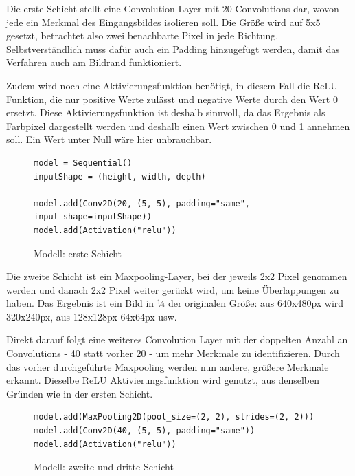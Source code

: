 \documentclass[conference]{IEEEtran}
\begin{document}
	Die erste Schicht stellt eine Convolution-Layer mit 20 Convolutions dar, 
	wovon jede ein Merkmal des Eingangsbildes isolieren soll.
	Die Größe wird auf 5x5 gesetzt, betrachtet also zwei benachbarte Pixel in 
	jede Richtung.
	Selbstverständlich muss dafür auch ein Padding hinzugefügt werden, damit das Verfahren auch am Bildrand funktioniert. 
	
	Zudem wird noch eine Aktivierungsfunktion benötigt, in diesem Fall  die 
	ReLU-Funktion, die nur positive Werte zulässt und negative Werte durch 
	den Wert 0 ersetzt.
	Diese Aktivierungsfunktion ist deshalb sinnvoll, da das Ergebnis als 
	Farbpixel dargestellt werden und deshalb einen Wert zwischen 0 und 1 
	annehmen soll.
	Ein Wert unter Null wäre hier unbrauchbar.
	
	\begin{figure}[!h]
		\centering
		\begin{verbatim}
model = Sequential()
inputShape = (height, width, depth)

model.add(Conv2D(20, (5, 5), padding="same", input_shape=inputShape))
model.add(Activation("relu"))
		\end{verbatim}
		\caption{Modell: erste Schicht}
		\label{Schicht eins}
	\end{figure}
	
	Die zweite Schicht ist ein Maxpooling-Layer, bei der jeweils 2x2 Pixel 
	genommen werden und danach 2x2 Pixel weiter gerückt wird, um keine 
	Überlappungen zu haben.
	Das Ergebnis ist ein Bild in ¼ der originalen Größe: aus 640x480px wird 320x240px, aus 128x128px 64x64px usw.
	
	Direkt darauf folgt eine weiteres Convolution Layer mit der doppelten 
	Anzahl an Convolutions - 40 statt vorher 20 - um mehr Merkmale zu 
	identifizieren.
	Durch das vorher durchgeführte Maxpooling werden nun andere, größere Merkmale erkannt.
	 Dieselbe ReLU Aktivierungsfunktion wird genutzt, aus denselben 
	 Gründen wie in der ersten Schicht.
	
	\begin{figure}[!h]
		\centering
		\begin{verbatim}
model.add(MaxPooling2D(pool_size=(2, 2), strides=(2, 2)))
model.add(Conv2D(40, (5, 5), padding="same"))
model.add(Activation("relu"))
		\end{verbatim}
		\caption{Modell: zweite und dritte Schicht}
		\label{Schicht zwei und drei}
	\end{figure}
	
	
\end{document}
